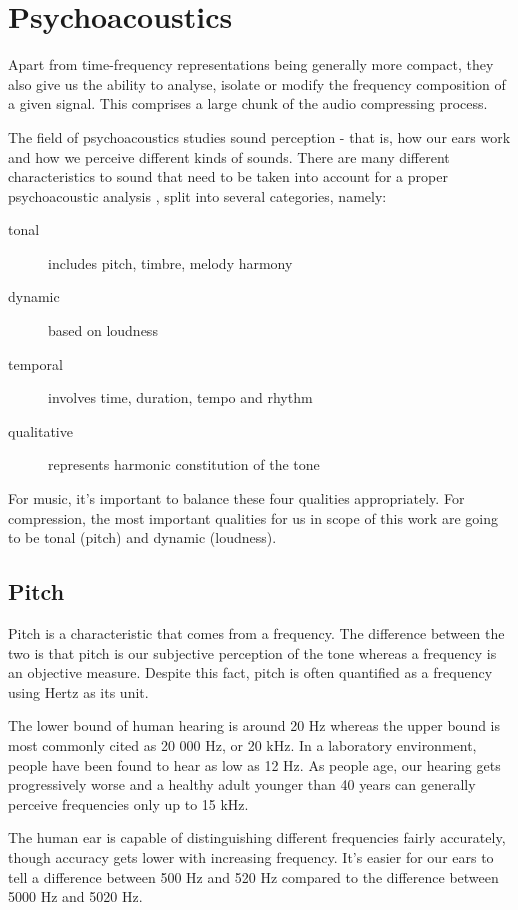 \section{Psychoacoustics}
Apart from time-frequency representations being generally more compact, they also give us the ability to analyse, isolate or modify the frequency composition of a given signal. This comprises a large chunk of the audio compressing process.

The field of psychoacoustics studies sound perception - that is, how our ears work and how we perceive different kinds of sounds. There are many different characteristics to sound that need to be taken into account for a proper psychoacoustic analysis \cite{olson1967music}, split into several categories, namely:

\begin{description}
	\item[tonal] includes pitch, timbre, melody harmony
	\item[dynamic] based on loudness
	\item[temporal] involves time, duration, tempo and rhythm
	\item[qualitative] represents harmonic constitution of the tone
\end{description}

For music, it's important to balance these four qualities appropriately. For compression, the most important qualities for us in scope of this work are going to be tonal (pitch) and dynamic (loudness).

\subsection{Pitch}
Pitch is a characteristic that comes from a frequency. The difference between the two is that pitch is our subjective perception of the tone whereas a frequency is an objective measure. Despite this fact, pitch is often quantified as a frequency using Hertz as its unit.

The lower bound of human hearing is around 20 Hz whereas the upper bound is most commonly cited as 20 000 Hz, or 20 kHz. \cite{rosen1993hearing} In a laboratory environment, people have been found to hear as low as 12 Hz. As people age, our hearing gets progressively worse and a healthy adult younger than 40 years can generally perceive frequencies only up to 15 kHz. \cite{olson1967music}

The human ear is capable of distinguishing different frequencies fairly accurately, though accuracy gets lower with increasing frequency. It's easier for our ears to tell a difference between 500 Hz and 520 Hz compared to the difference between 5000 Hz and 5020 Hz. \cite{smacdon_2018}

